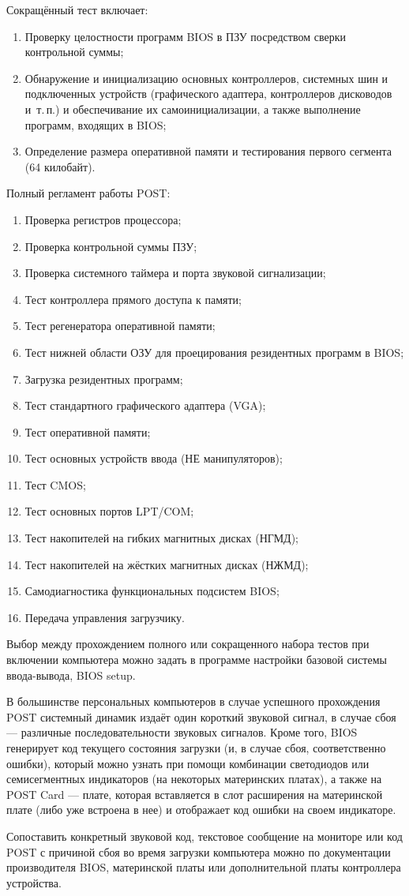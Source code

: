 Сокращённый тест включает:
\begin{enumerate}
 \item Проверку целостности программ BIOS в ПЗУ посредством сверки контрольной суммы;
 \item Обнаружение и инициализацию основных контроллеров, системных шин и подключенных устройств (графического адаптера, контроллеров дисководов и~т.\,п.) и обеспечивание их самоинициализации, а также выполнение программ, входящих в BIOS;
 \item Определение размера оперативной памяти и тестирования первого сегмента (64 килобайт).
\end{enumerate}

Полный регламент работы POST:
\begin{enumerate}
 \item Проверка регистров процессора;
 \item Проверка контрольной суммы ПЗУ;
 \item Проверка системного таймера и порта звуковой сигнализации;
 \item Тест контроллера прямого доступа к памяти;
 \item Тест регенератора оперативной памяти;
 \item Тест нижней области ОЗУ для проецирования резидентных программ в BIOS;
 \item Загрузка резидентных программ;
 \item Тест стандартного графического адаптера (VGA);
 \item Тест оперативной памяти;
 \item Тест основных устройств ввода (НЕ манипуляторов);
 \item Тест CMOS;
 \item Тест основных портов LPT/COM;
 \item Тест накопителей на гибких магнитных дисках (НГМД);
 \item Тест накопителей на жёстких магнитных дисках (НЖМД);
 \item Самодиагностика функциональных подсистем BIOS;
 \item Передача управления загрузчику.
\end{enumerate}

Выбор между прохождением полного или сокращенного набора тестов при включении компьютера можно задать в программе настройки базовой системы ввода-вывода, BIOS setup.

В большинстве персональных компьютеров в случае успешного прохождения POST системный динамик издаёт один короткий звуковой сигнал, в случае сбоя --- различные последовательности звуковых сигналов. Кроме того, BIOS генерирует код текущего состояния загрузки (и, в случае сбоя, соответственно ошибки), который можно узнать при помощи комбинации светодиодов или семисегментных индикаторов (на некоторых материнских платах), а также на POST Card --- плате, которая вставляется в слот расширения на материнской плате (либо уже встроена в нее) и отображает код ошибки на своем индикаторе.
 
Сопоставить конкретный звуковой код, текстовое сообщение на мониторе или код POST с причиной сбоя во время загрузки компьютера можно по документации производителя BIOS, материнской платы или дополнительной платы контроллера устройства.
